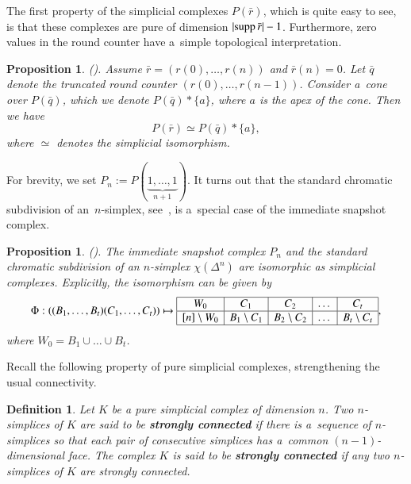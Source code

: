 \documentclass{amsart}[10pt]
\newtheorem{df}[theorem]{Definition}
\newtheorem{prop}[theorem]{Proposition}
\newcommand{\da}{\Delta}
\newcommand{\sm}{\setminus}
\newcommand{\supp}{\text{\rm supp}\,}
\newcommand{\tr}{{\bar r}}
\numberwithin{equation}{section}
\numberwithin{figure}{section}
\numberwithin{table}{section}
\begin{document}
The first property of the simplicial complexes $P(\tr)$, which is
quite easy to see, is that these complexes are pure of dimension
$|\supp\tr|-1$. Furthermore, zero values in the round counter have
a~simple topological interpretation.

\begin{prop}\label{prop:p4}{\rm (\cite[Proposition 4.4]{k1}).}
Assume $\tr=(r(0),\dots,r(n))$ and $\tr(n)=0$. Let $\bar q$ denote the
truncated round counter $(r(0),\dots,r(n-1))$. Consider a~cone over
$P(\bar q)$, which we denote $P(\bar q)*\{a\}$, where $a$ is the apex
of the cone. Then we have
\begin{equation}\label{eq:ptr} 
P(\tr)\simeq P(\bar q)*\{a\},
\end{equation} 
where $\simeq$ denotes the simplicial isomorphism.
\end{prop}

For brevity, we set $P_n:=P(\underbrace{1,\dots,1}_{n+1})$. It turns
out that the standard chromatic subdivision of an~$n$-simplex,
see~\cite{subd}, is a~special case of the immediate snapshot complex.

\begin{prop} {\rm (\cite[Proposition 4.10]{k1}).}
The immediate snapshot complex $P_n$ and the standard chromatic
subdivision of an $n$-simplex $\chi(\da^n)$ are isomorphic as
simplicial complexes. Explicitly, the isomorphism can be given by
\begin{equation}\label{eq:bc}
\Phi:((B_1,\dots,B_t)(C_1,\dots,C_t))\mapsto
\begin{array}{|c|c|c|c|c|}
\hline
W_0 & C_1        & C_2        & \dots & C_t \\ \hline
[n]\sm W_0 & B_1\sm C_1 & B_2\sm C_2 & \dots & B_t\sm C_t \\ 
\hline
\end{array},
\end{equation}
where $W_0=B_1\cup\dots\cup B_t$.
\end{prop}

Recall the following property of pure simplicial complexes,
strengthening the usual connectivity.

\begin{df}
Let $K$ be a pure simplicial complex of dimension $n$. Two
$n$-simplices of $K$ are said to be {\bf strongly connected} if there
is a~sequence of $n$-simplices so that each pair of consecutive
simplices has a~common $(n-1)$-dimensional face. The complex $K$ is
said to be {\bf strongly connected} if any two $n$-simplices of $K$
are strongly connected.
\end{df}
\end{document}

